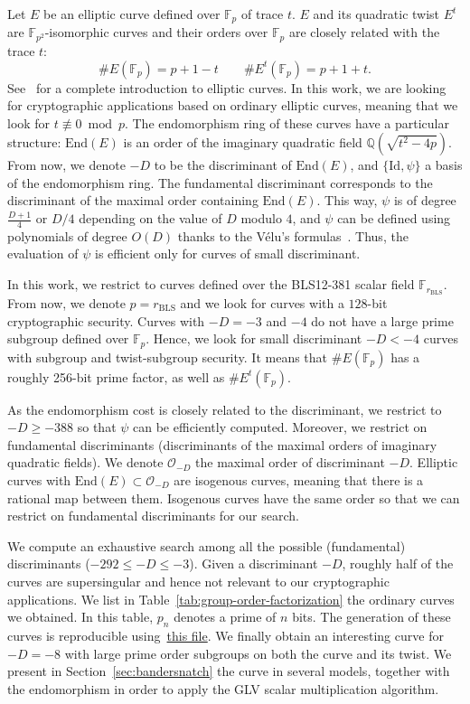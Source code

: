 \documentclass[smallextended]{svjour3}
\newcommand{\Q}{\ensuremath{\mathbb Q}}
\newcommand{\Fp}{\ensuremath{\mathbb F_p}}
\newcommand{\End}{\ensuremath{\text{End}}}
\begin{document}
Let $E$ be an elliptic curve defined over $\Fp$ of trace $t$. $E$ and
its quadratic twist $E^t$ are $\mathbb F_{p^2}$-isomorphic curves and
their orders over $\Fp$ are closely related with the trace
$t$:
$$\#E(\Fp) = p+1-t\qquad \#E^t(\Fp) = p+1+t.$$
See~\cite{Silverman86} for a complete introduction to elliptic curves.
In this work, we are looking for cryptographic applications based on
ordinary elliptic curves, meaning that we look for $t\not\equiv 0
\bmod p$. The endomorphism ring of these curves have a particular
structure: $\End(E)$ is an order of the imaginary quadratic field
$\Q(\sqrt{t^2-4p})$.
From now, we denote $-D$ to be the discriminant of $\End(E)$, and
$\{\text{Id},\psi\}$ a basis of the endomorphism ring.
The fundamental discriminant corresponds to the discriminant of the
maximal order containing $\End(E)$.
This way, $\psi$ is of degree $\frac{D+1}4$ or $D/4$ depending on the
value of $D$ modulo $4$, and $\psi$ can be defined using polynomials
of degree $O(D)$ thanks to the Vélu's formulas~\cite{velu71}.
Thus, the evaluation of $\psi$ is efficient only for curves of small
discriminant.

In this work, we restrict to curves defined over the BLS12-381 scalar
field $\mathbb F_{r_\text{BLS}}$. From now, we denote $p=r_\text{BLS}$
and we look for curves with a $128$-bit cryptographic security.
Curves with $-D=-3$ and $-4$ do not have a large prime subgroup
defined over $\Fp$.
Hence, we look for small discriminant $-D<-4$ curves with subgroup and
twist-subgroup security. It means that $\#E(\Fp)$ has a roughly 256-bit
prime factor, as well as $\#E^t(\Fp)$.

As the endomorphism cost is closely related to the discriminant, we
restrict to $-D \geq -388$ so that $\psi$ can be efficiently computed.
Moreover, we restrict on fundamental discriminants (discriminants
of the maximal orders of imaginary quadratic fields). We denote
$\mathcal O_{-D}$ the maximal order of discriminant $-D$. Elliptic
curves with $\End(E) \subset \mathcal O_{-D}$ are isogenous curves,
meaning that there is a rational map between them. Isogenous curves
have the same order so that we can restrict on fundamental
discriminants for our search.

We compute an exhaustive search among all the possible (fundamental)
discriminants ($-292 \leq -D \leq -3$).
Given a discriminant $-D$, roughly half of the curves are
supersingular and hence not relevant to our cryptographic
applications.
We list in Table~\ref{tab:group-order-factorization} the ordinary
curves we obtained. In this table, $p_n$ denotes a prime of $n$ bits.
The generation of these curves is reproducible
using~\href{https://github.com/asanso/Bandersnatch/blob/main/python-ref-impl/small-disc-curves.py}{this
  file}.
We finally obtain an interesting curve for $-D = -8$ with large prime
order subgroups on both the curve and its twist.
We present in Section~\ref{sec:bandersnatch} the curve in several
models, together with the endomorphism in order to apply the GLV
scalar multiplication algorithm.
\end{document}
